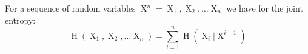 For a sequence of random variables $ \operatorname{X}^{n} = \operatorname{X}_{1}, \operatorname{X}_{2}, \dots \operatorname{X}_{n}$ we have for the joint entropy:
$$\operatorname{H}( \operatorname{X}_{1}, \operatorname{X}_{2}, \dots \operatorname{X}_{n} ) = \sum\limits_{i = 1}^{n} \operatorname{H}(\operatorname{X}_{i} | \operatorname{X}^{i - 1})$$
